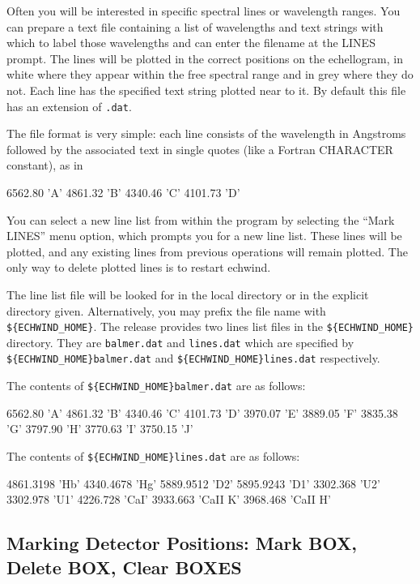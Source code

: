 \documentclass[11pt,nolof,noabs]{starlink}
\begin{document}
Often you will be interested in specific spectral lines or wavelength
ranges. You can prepare a text file containing a list of wavelengths and
text strings with which to label those wavelengths and can enter the
filename at the LINES prompt. The lines will be plotted in the correct
positions on the echellogram, in white where they appear within the free
spectral range and in grey where they do not. Each line has the specified
text string plotted near to it. By default this file has an extension of
\texttt{.dat}.

The file format is very simple: each line
consists of the wavelength in Angstroms followed by the associated text in
single quotes (like a Fortran CHARACTER constant), as in
\begin{terminalv}
6562.80 'A'
4861.32 'B'
4340.46 'C'
4101.73 'D'
\end{terminalv}

You can select a new line list from within the program by selecting the ``Mark
LINES'' menu option, which prompts you for a new line list. These lines will
be plotted, and any existing lines from previous operations will remain
plotted. The only way to delete plotted lines is to restart echwind.

The line list file will be looked for in the local directory or in the explicit
directory given. Alternatively, you may prefix the file name with
\verb+${ECHWIND_HOME}+. The release provides two lines list files in the
\verb+${ECHWIND_HOME}+ directory. They are \texttt{balmer.dat} and
\texttt{lines.dat} which are specified by
\verb+${ECHWIND_HOME}balmer.dat+
and \verb+${ECHWIND_HOME}lines.dat+ respectively.

The contents of \verb+${ECHWIND_HOME}balmer.dat+ are as follows:

\begin{terminalv}
6562.80 'A'
4861.32 'B'
4340.46 'C'
4101.73 'D'
3970.07 'E'
3889.05 'F'
3835.38 'G'
3797.90 'H'
3770.63 'I'
3750.15 'J'
\end{terminalv}

The contents of \verb+${ECHWIND_HOME}lines.dat+ are as follows:

\begin{terminalv}
4861.3198 'Hb'
4340.4678 'Hg'
5889.9512 'D2'
5895.9243 'D1'
3302.368  'U2'
3302.978  'U1'
4226.728  'CaI'
3933.663  'CaII K'
3968.468  'CaII H'
\end{terminalv}

\subsection{Marking Detector Positions: Mark BOX, Delete BOX, Clear BOXES}
\end{document}

